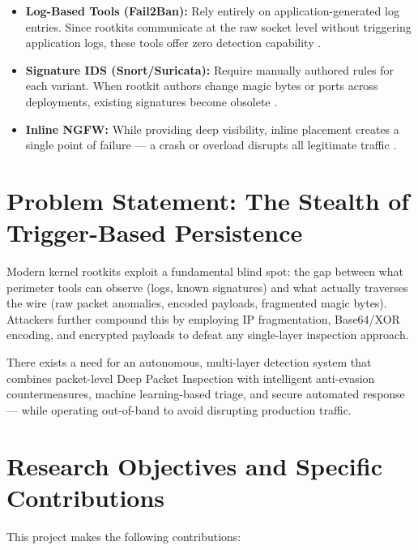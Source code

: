 \begin{itemize}
    \item \textbf{Log-Based Tools (Fail2Ban):} Rely entirely on application-generated log entries. Since rootkits communicate at the raw socket level without triggering application logs, these tools offer zero detection capability \cite{fail2ban2024}.
    
    \item \textbf{Signature IDS (Snort/Suricata):} Require manually authored rules for each variant. When rootkit authors change magic bytes or ports across deployments, existing signatures become obsolete \cite{roesch1999snort, suricata2024}.
    
    \item \textbf{Inline NGFW:} While providing deep visibility, inline placement creates a single point of failure --- a crash or overload disrupts all legitimate traffic \cite{paloalto2024}.
\end{itemize}

\section{Problem Statement: The Stealth of Trigger-Based Persistence}

Modern kernel rootkits exploit a fundamental blind spot: the gap between what perimeter tools can observe (logs, known signatures) and what actually traverses the wire (raw packet anomalies, encoded payloads, fragmented magic bytes). Attackers further compound this by employing IP fragmentation, Base64/XOR encoding, and encrypted payloads to defeat any single-layer inspection approach.

There exists a need for an autonomous, multi-layer detection system that combines packet-level Deep Packet Inspection with intelligent anti-evasion countermeasures, machine learning-based triage, and secure automated response --- while operating out-of-band to avoid disrupting production traffic.

\section{Research Objectives and Specific Contributions}

This project makes the following contributions:

